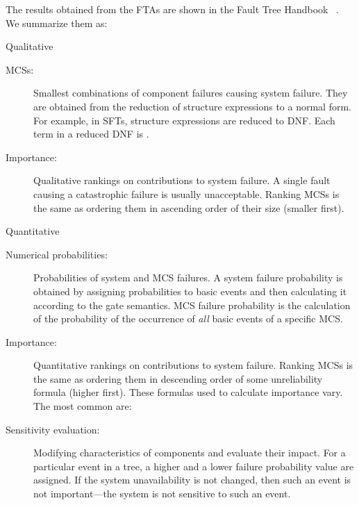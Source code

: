 \documentclass[12pt,openright,twoside,a4paper,oldfontcommands,english,brazil,final]{abntex2}
\theoremstyle{theo}
\def\FThandbook{Fault Tree Handbook~\cite{VGR+1981}\index{Fault Tree!Handbook}%
  \gdef\FThandbook{Fault Tree Handbook\index{Fault Tree!Handbook}\xspace}%
  \xspace}
\begin{document}
\begin{sloppypar}
The results obtained from the \acp{FTA} are shown in the \FThandbook.
We summarize them as:
%
\begin{alineas}
  \item Qualitative
  \begin{description}
    \item[\Acp{MCS}:]
    Smallest combinations of component failures causing system failure.
    They are obtained from the reduction of structure expressions to a normal form.
    For example, in \acp{SFT}, structure expressions are reduced to \ac{DNF}.
    Each term in a reduced \ac{DNF} is .
    \item[Importance:]
    Qualitative rankings on contributions to system failure.
    A single fault causing a catastrophic failure is usually unacceptable.
    Ranking \acp{MCS} is the same as ordering them in ascending order of their size (smaller first).
  \end{description}
  \item Quantitative
  \begin{description}
    \item[Numerical probabilities:]
    Probabilities of system and \ac{MCS} failures.
    A system failure probability is obtained by assigning probabilities to basic events and then calculating it according to the gate semantics.
    \Ac{MCS} failure probability is the calculation of the probability of the occurrence of \emph{all} basic events of a specific \ac{MCS}.
    \item[Importance:]
    Quantitative rankings on contributions to system failure.
    Ranking \acp{MCS} is the same as ordering them in descending order of some unreliability formula (higher first).
    These formulas used to calculate importance vary.
    The most common are:
    \item[Sensitivity evaluation:]
    Modifying characteristics of components and evaluate their impact.
    For a particular event in a tree, a higher and a lower failure probability value are assigned.
    If the system unavailability is not changed, then such an event is not important---the system is not sensitive to such an event.
  \end{description}\end{alineas}
\end{sloppypar}
\end{document}
